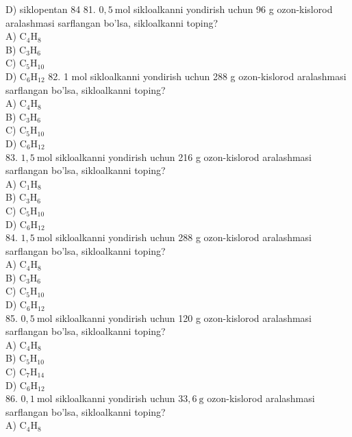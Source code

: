D) siklopentan 84
81. $0,5 \mathrm{~mol}$ sikloalkanni yondirish uchun 96 g ozon-kislorod aralashmasi sarflangan bo'lsa, sikloalkanni toping?\\
A) $\mathrm{C}_{4} \mathrm{H}_{8}$\\
B) $\mathrm{C}_{3} \mathrm{H}_{6}$\\
C) $\mathrm{C}_{5} \mathrm{H}_{10}$\\
D) $\mathrm{C}_{6} \mathrm{H}_{12}$
82. 1 mol sikloalkanni yondirish uchun 288 g ozon-kislorod aralashmasi sarflangan bo'lsa, sikloalkanni toping?\\
A) $\mathrm{C}_{4} \mathrm{H}_{8}$\\
B) $\mathrm{C}_{3} \mathrm{H}_{6}$\\
C) $\mathrm{C}_{5} \mathrm{H}_{10}$\\
D) $\mathrm{C}_{6} \mathrm{H}_{12}$\\
83. $1,5 \mathrm{~mol}$ sikloalkanni yondirish uchun 216 g ozon-kislorod aralashmasi sarflangan bo'lsa, sikloalkanni toping?\\
A) $\mathrm{C}_{1} \mathrm{H}_{8}$\\
B) $\mathrm{C}_{3} \mathrm{H}_{6}$\\
C) $\mathrm{C}_{5} \mathrm{H}_{10}$\\
D) $\mathrm{C}_{6} \mathrm{H}_{12}$\\
84. $1,5 \mathrm{~mol}$ sikloalkanni yondirish uchun 288 g ozon-kislorod aralashmasi sarflangan bo'lsa, sikloalkanni toping?\\
A) $\mathrm{C}_{4} \mathrm{H}_{8}$\\
B) $\mathrm{C}_{3} \mathrm{H}_{6}$\\
C) $\mathrm{C}_{5} \mathrm{H}_{10}$\\
D) $\mathrm{C}_{6} \mathrm{H}_{12}$\\
85. $0,5 \mathrm{~mol}$ sikloalkanni yondirish uchun 120 g ozon-kislorod aralashmasi sarflangan bo'lsa, sikloalkanni toping?\\
A) $\mathrm{C}_{4} \mathrm{H}_{8}$\\
B) $\mathrm{C}_{5} \mathrm{H}_{10}$\\
C) $\mathrm{C}_{7} \mathrm{H}_{14}$\\
D) $\mathrm{C}_{6} \mathrm{H}_{12}$\\
86. $0,1 \mathrm{~mol}$ sikloalkanni yondirish uchun $33,6 \mathrm{~g}$ ozon-kislorod aralashmasi sarflangan bo'lsa, sikloalkanni toping?\\
A) $\mathrm{C}_{4} \mathrm{H}_{8}$\\
